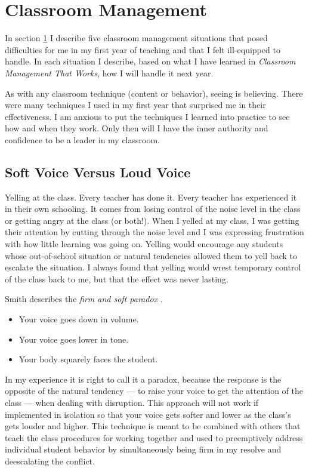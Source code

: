 \documentclass[11pt,twocolumn]{article}%
\def\cmtw{{\em Classroom Management That Works}}
\begin{document}
\section{Classroom Management}
\label{Classroom Management}

In section \ref{Classroom Management} I describe five classroom
management situations that posed difficulties for me in my first
year of teaching and that I felt ill-equipped to handle. In each
situation I describe, based on what I have learned in \cmtw, how I
will handle it next year.

As with any classroom technique (content or behavior), seeing is
believing. There were many techniques I used in my first year that
surprised me in their effectiveness. I am anxious to put the
techniques I learned into practice to see how and when they work.
Only then will I have the inner authority and confidence to be a
leader in my classroom.

\subsection{Soft Voice Versus Loud Voice}
\label{Soft Voice Versus Loud Voice}

Yelling at the class. Every teacher has done it. Every teacher has
experienced it in their own schooling. It comes from losing control
of the noise level in the class or getting angry at the class (or
both!). When I yelled at my class, I was getting their attention by
cutting through the noise level and I was expressing frustration
with how little learning was going on. Yelling would encourage any
students whose out-of-school situation or natural tendencies allowed
them to yell back to escalate the situation. I always found that
yelling would wrest temporary control of the class back to me, but
that the effect was never lasting.

Smith describes the {\em firm and soft paradox} \cite{book:ccm}.

\begin{itemize}\item Your voice goes down in volume. \item Your voice
goes lower in tone. \item Your body squarely faces the
student.\end{itemize}

In my experience it is right to call it a paradox, because the
response is the opposite of the natural tendency --- to raise your
voice to get the attention of the class --- when dealing with
disruption. This approach will not work if implemented in isolation
so that your voice gets softer and lower as the class's gets louder
and higher. This technique is meant to be combined with others that
teach the class procedures for working together and used to
preemptively address individual student behavior by simultaneously
being firm in my resolve and deescalating the conflict.
\end{document}
